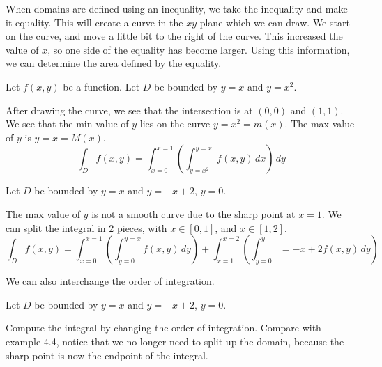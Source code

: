 \documentclass[11pt,fleqn]{book} %
\begin{document}
When domains are defined using an inequality, we take the inequality and make it equality. This will create a curve in the $xy$-plane which we can draw. We start on the curve, and move a little bit to the right of the curve. This increased the value of $x$, so one side of the equality has become larger. Using this information, we can determine the area defined by the equality.

\begin{example}
    Let $f(x, y)$ be a function. Let $D$ be bounded by $y = x$ and $y = x^2$.

    \begin{center}
    \end{center}

    After drawing the curve, we see that the intersection is at $(0, 0)$ and $(1, 1)$. We see that the min value of $y$ lies on the curve $y = x^2 = m(x)$. The max value of $y$ is $y = x = M(x)$.
    $$\int_D f(x, y) = \int_{x=0}^{x=1} \left( \int_{y=x^2}^{y=x} f(x, y) \,dx \right) \,dy$$
\end{example}

\begin{example}
    Let $D$ be bounded by $y = x$ and $y = -x + 2$, $y = 0$.

    The max value of $y$ is not a smooth curve due to the sharp point at $x = 1$. We can split the integral in 2 pieces, with $x \in [0, 1]$, and $x \in [1, 2]$.
    $$\int_D f(x, y) = \int_{x=0}^{x=1} \left( \int_{y=0}^{y=x} f(x, y) \,dy \right) + \int_{x=1}^{x=2} \left( \int_{y=0}^y={-x+2} f(x, y) \,dy \right)$$

    We can also interchange the order of integration.
\end{example}

\begin{exercise}
    Let $D$ be bounded by $y = x$ and $y = -x + 2$, $y = 0$.

    Compute the integral by changing the order of integration. Compare with example 4.4, notice that we no longer need to split up the domain, because the sharp point is now the endpoint of the integral.
\end{exercise}
\end{document}
